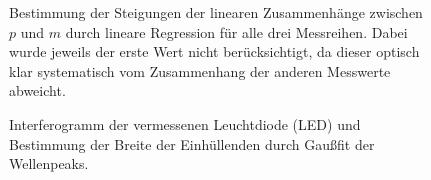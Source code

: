 \documentclass[12pt,a4paper,german]{scrartcl}
\numberwithin{equation}{section}
\begin{document}
  \begin{figure}[H]
    \centering
    
    \caption{Bestimmung der Steigungen der linearen Zusammenhänge zwischen $p$ und $m$ durch lineare Regression für alle drei Messreihen.
    Dabei wurde jeweils der erste Wert nicht berücksichtigt, da dieser optisch klar systematisch vom Zusammenhang der anderen Messwerte abweicht.}
  \end{figure}

  \begin{figure}[H]
    \centering
    
    \caption{Interferogramm der vermessenen Leuchtdiode (LED) und Bestimmung der Breite der Einhüllenden durch Gaußfit der Wellenpeaks.}
  \end{figure}
\end{document}
